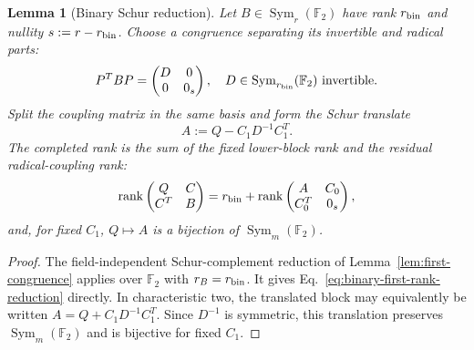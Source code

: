 \documentclass[11pt]{article}
\newcommand{\F}{\mathbb F}
\newcommand{\Sym}{\operatorname{Sym}}
\newcommand{\rank}{\operatorname{rank}}
\newcommand{\1}{\mathbf 1}
\theoremstyle{plain}
\newtheorem{lemma}[theorem]{Lemma}
\theoremstyle{definition}
\theoremstyle{remark}
\begin{document}
\begin{lemma}[Binary Schur reduction]
\label{lem:binary-Schur-reduction}
Let $B\in\Sym_r(\F_2)$ have rank $r_{\rm bin}$ and nullity
$s:=r-r_{\rm bin}$.  Choose a congruence separating its invertible and radical
parts:
\begin{equation}
 P^TBP=\begin{pmatrix}D&0\\0&0_s\end{pmatrix},
 \quad D\in\Sym_{r_{\rm bin}}(\F_2)\text{ invertible}.
 \label{eq:binary-lower-block-rank-decomposition}
\end{equation}
Split the coupling matrix in the same basis and form the Schur translate
\begin{equation}
 A:=Q-C_1D^{-1}C_1^T.
 \label{eq:binary-Schur-translation}
\end{equation}
The completed rank is the sum of the fixed lower-block rank and the residual
radical-coupling rank:
\begin{equation}
 \rank\begin{pmatrix}Q&C\\C^T&B\end{pmatrix}
 =r_{\rm bin}+
 \rank\begin{pmatrix}A&C_0\\C_0^T&0_s\end{pmatrix},
 \label{eq:binary-first-rank-reduction}
\end{equation}
and, for fixed $C_1$, $Q\mapsto A$ is a bijection of
$\Sym_m(\F_2)$.
\end{lemma}
\begin{proof}
The field-independent Schur-complement reduction of
Lemma~\ref{lem:first-congruence} applies over $\F_2$ with $r_B=r_{\rm bin}$.
It gives Eq.~\eqref{eq:binary-first-rank-reduction} directly.  In
characteristic two, the translated block may equivalently be written
$A=Q+C_1D^{-1}C_1^T$.  Since $D^{-1}$ is symmetric, this translation preserves
$\Sym_m(\F_2)$ and is bijective for fixed $C_1$.
\end{proof}
\end{document}
